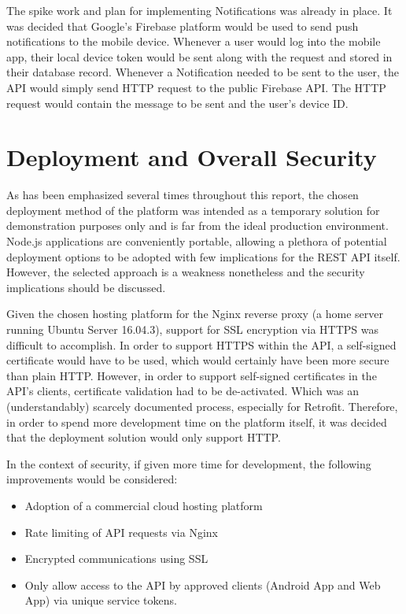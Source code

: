 The spike work and plan for implementing Notifications was already in place. It was decided that Google's Firebase platform would be used to send push notifications to the mobile device. Whenever a user would log into the mobile app, their local device token would be sent along with the request and stored in their database record. Whenever a Notification needed to be sent to the user, the API would simply send HTTP request to the public Firebase API. The HTTP request would contain the message to be sent and the user's device ID.

\section{Deployment and Overall Security}
As has been emphasized several times throughout this report, the chosen deployment method of the platform was intended as a temporary solution for demonstration purposes only and is far from the ideal production environment. Node.js applications are conveniently portable, allowing a plethora of potential deployment options to be adopted with few implications for the REST API itself. However, the selected approach is a weakness nonetheless and the security implications should be discussed.

Given the chosen hosting platform for the Nginx reverse proxy (a home server running Ubuntu Server 16.04.3), support for SSL encryption via HTTPS was difficult to accomplish. In order to support HTTPS within the API, a self-signed certificate would have to be used, which would certainly have been more secure than plain HTTP. However, in order to support self-signed certificates in the API's clients, certificate validation had to be de-activated. Which was an (understandably) scarcely documented process, especially for Retrofit. Therefore, in order to spend more development time on the platform itself, it was decided that the deployment solution would only support HTTP.

In the context of security, if given more time for development, the following improvements would be considered:

\begin{itemize}
	\item Adoption of a commercial cloud hosting platform
	\item Rate limiting of API requests via Nginx
	\item Encrypted communications using SSL
	\item Only allow access to the API by approved clients (Android App and Web App) via unique service tokens.
\end{itemize}

